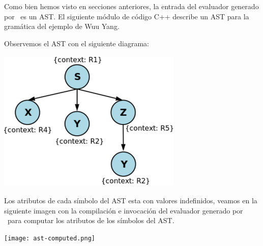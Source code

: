 Como bien hemos visto en secciones anteriores, la entrada del evaluador generado por \maggen\ es un AST. El siguiente módulo de código C++ describe un AST para la gramática del ejemplo de Wuu Yang.

\tiny

\normalsize

Observemos el AST con el siguiente diagrama:
\begin{center}
\includegraphics[width=250pt,height=193pt]{ast.png}
\end{center}
Los atributos de cada símbolo del AST esta con valores indefinidos, veamos en la siguiente imagen con la compilación e invocación del evaluador generado por \maggen\ para computar los atributos de los símbolos del AST.
\begin{center}
\texttt{[image: ast-computed.png]}
\end{center} 

